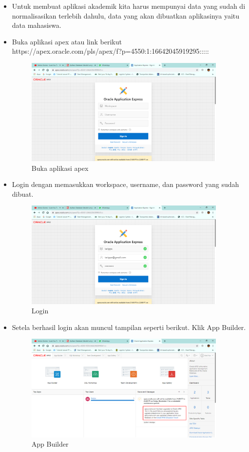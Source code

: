\begin{itemize}
    \item Untuk membuat aplikasi akademik kita harus mempunyai data yang sudah di normalisasikan terlebih dahulu, data yang akan dibuatkan aplikasinya yaitu data mahasiswa.
    
    \item Buka aplikasi apex atau link berikut\\ https://apex.oracle.com/pls/apex/f?p=4550:1:16642045919295:::::
    \begin{figure}[!htbp]
        \centering
        \includegraphics[width=10cm]{figures/1.PNG}
        \caption{Buka aplikasi apex}
    \end{figure}
    
    \newpage
    
    \item Login dengan memasukkan workspace, username, dan password yang sudah dibuat.
    \begin{figure}[!htbp]
        \centering
        \includegraphics[width=10cm]{figures/2.PNG}
        \caption{Login}
    \end{figure}
    
    \item Setela berhasil login akan muncul tampilan seperti berikut. Klik App Builder.
    \begin{figure}[!htbp]
        \centering
        \includegraphics[width=10cm]{figures/3.PNG}
        \caption{App Builder}
    \end{figure}
    

\end{itemize}

